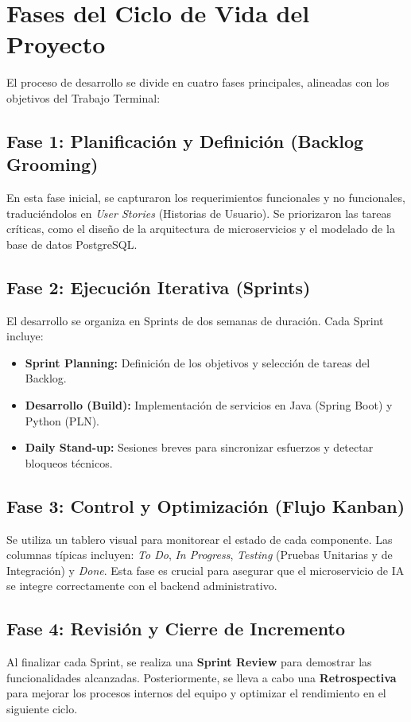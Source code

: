 \section{Fases del Ciclo de Vida del Proyecto}
El proceso de desarrollo se divide en cuatro fases principales, alineadas con los objetivos del Trabajo Terminal:

\subsection{Fase 1: Planificación y Definición (Backlog Grooming)}
En esta fase inicial, se capturaron los requerimientos funcionales y no funcionales, traduciéndolos en \textit{User Stories} (Historias de Usuario). Se priorizaron las tareas críticas, como el diseño de la arquitectura de microservicios y el modelado de la base de datos PostgreSQL.

\subsection{Fase 2: Ejecución Iterativa (Sprints)}
El desarrollo se organiza en Sprints de dos semanas de duración. Cada Sprint incluye:
\begin{itemize}
    \item \textbf{Sprint Planning:} Definición de los objetivos y selección de tareas del Backlog.
    \item \textbf{Desarrollo (Build):} Implementación de servicios en Java (Spring Boot) y Python (PLN).
    \item \textbf{Daily Stand-up:} Sesiones breves para sincronizar esfuerzos y detectar bloqueos técnicos.
\end{itemize}

\subsection{Fase 3: Control y Optimización (Flujo Kanban)}
Se utiliza un tablero visual para monitorear el estado de cada componente. Las columnas típicas incluyen: \textit{To Do}, \textit{In Progress}, \textit{Testing} (Pruebas Unitarias y de Integración) y \textit{Done}. Esta fase es crucial para asegurar que el microservicio de IA se integre correctamente con el backend administrativo.

\subsection{Fase 4: Revisión y Cierre de Incremento}
Al finalizar cada Sprint, se realiza una \textbf{Sprint Review} para demostrar las funcionalidades alcanzadas. Posteriormente, se lleva a cabo una \textbf{Retrospectiva} para mejorar los procesos internos del equipo y optimizar el rendimiento en el siguiente ciclo.

